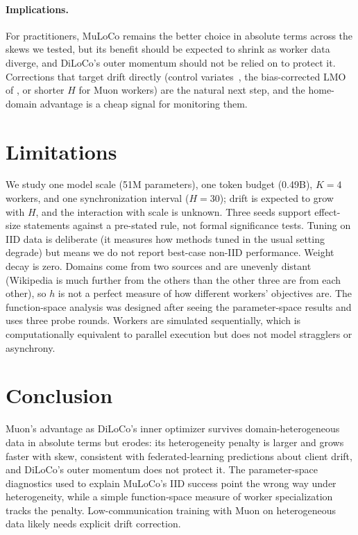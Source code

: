 \documentclass{article}
\begin{document}
\paragraph{Implications.} For practitioners, MuLoCo remains the better choice in absolute terms across the skews we tested, but its benefit should be expected to shrink as worker data diverge, and DiLoCo's outer momentum should not be relied on to protect it. Corrections that target drift directly (control variates~\cite{karimireddy2020scaffold}, the bias-corrected LMO of \citet{takezawa2026fedmuon}, or shorter $H$ for Muon workers) are the natural next step, and the home-domain advantage is a cheap signal for monitoring them.

\section{Limitations}\label{sec:limitations}
We study one model scale (51M parameters), one token budget (0.49B), $K=4$ workers, and one synchronization interval ($H=30$); drift is expected to grow with $H$, and the interaction with scale is unknown. Three seeds support
effect-size statements against a pre-stated rule, not formal significance tests. Tuning on IID data is deliberate (it measures how methods tuned in the usual setting degrade) but means we do not report best-case non-IID performance. Weight decay is zero. Domains come from two sources and are unevenly distant (Wikipedia is much further from the others than the other three are from each other), so $h$ is not a perfect measure of how different workers' objectives are. The function-space analysis was designed after seeing the parameter-space results and uses three probe rounds. Workers are simulated sequentially, which is computationally equivalent to parallel execution but does not model stragglers or asynchrony.

\section{Conclusion}
Muon's advantage as DiLoCo's inner optimizer survives domain-heterogeneous data in absolute terms but erodes: its heterogeneity penalty is larger and grows faster with skew, consistent with federated-learning predictions about
client drift, and DiLoCo's outer momentum does not protect it. The parameter-space diagnostics used to explain MuLoCo's IID success point the wrong way under heterogeneity, while a simple function-space measure of worker specialization tracks the penalty. Low-communication training with Muon on heterogeneous data likely needs explicit drift correction.
\end{document}
